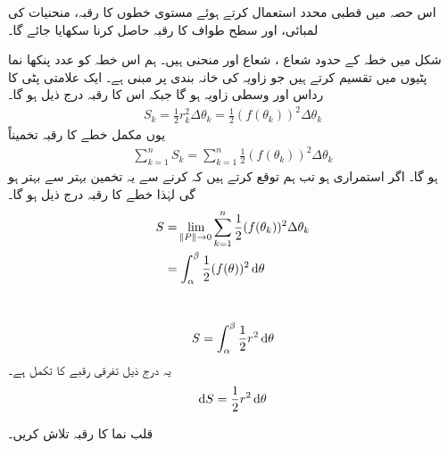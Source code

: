 اس حصہ میں قطبی محدد استعمال کرتے ہوئے مستوی خطوں کا رقبہ، منحنیات کی لمبائی، اور سطح طواف کا رقبہ حاصل کرنا سکھایا جائے گا۔

شکل میں خطہ  کے حدود  شعاع ، شعاع  اور منحنی  ہیں۔  ہم اس خطہ کو  عدد پنکھا نما پٹیوں میں تقسیم کرتے ہیں جو زاویہ  کی خانہ بندی  پر مبنی ہے۔ ایک علامتی پٹی کا رداس  اور وسطی زاویہ  ہو گا جبکہ اس کا رقبہ درج ذیل ہو گا۔
\begin{align*}
S_k=\frac{1}{2}r_k^2\Delta \theta_k=\frac{1}{2}(f(\theta_k))^2\Delta \theta_k
\end{align*}
یوں مکمل خطے کا رقبہ تخمیناً
\begin{align*}
\sum_{k=1}^{n}S_k=\sum_{k=1}^{n}\frac{1}{2}(f(\theta_k))^2\Delta \theta_k
\end{align*}
ہو گا۔ اگر  استمراری ہو تب ہم توقع کرتے ہیں کہ  کرنے سے یہ تخمین بہتر سے بہتر ہو گی لہٰذا خطے کا رقبہ درج ذیل ہو گا۔
\begin{align*}
S&=\lim_{\norm{P}\to 0}\sum_{k=1}^{n}\frac{1}{2}(f(\theta_k))^2\Delta\theta_k\\
&=\int_{\alpha}^{\beta}\frac{1}{2}(f(\theta))^2\dif\theta
\end{align*}

\\
\begin{align*}
S=\int_{\alpha}^{\beta}\frac{1}{2}r^2\dif\theta
\end{align*}
یہ درج ذیل تفرقی رقبے کا تکمل ہے۔
\begin{align*}
\dif S=\frac{1}{2}r^2\dif\theta
\end{align*}

قلب نما  کا رقبہ تلاش کریں۔

